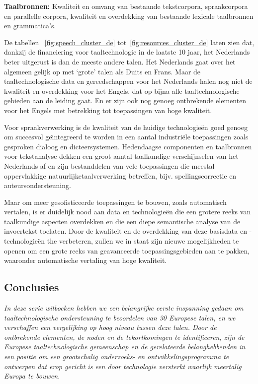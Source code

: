 \documentclass[]{../../metanetpaper}
\begin{document}
\begin{multicols}{2}
\textbf{Taalbronnen:} Kwaliteit en omvang van bestaande tekstcorpora, spraakcorpora en parallelle corpora, kwaliteit en overdekking van bestaande lexicale taalbronnen en grammatica’s.


De tabellen ~\ref{fig:speech_cluster_de} tot~\ref{fig:resources_cluster_de}  laten zien dat, dankzij de financiering voor taaltechnologie in de laatste 10 jaar, het Nederlands beter uitgerust is dan de meeste andere talen. Het Nederlands gaat over het algemeen gelijk op met `grote' talen als Duits en Frans. Maar de taaltechnologische data en gereedschappen voor het Nederlands halen nog niet de kwaliteit en overdekking voor het Engels, dat op bijna alle taaltechnologische gebieden aan de leiding gaat. En er zijn ook nog genoeg ontbrekende elementen voor het Engels met betrekking tot toepassingen van hoge kwaliteit.

   Voor spraakverwerking is de kwaliteit van de huidige technologie{\"e}n goed genoeg om succesvol ge{\"\i}ntegreerd te worden in een aantal industri{\"e}le toepassingen zoals gesproken dialoog en dicteersystemen. Hedendaagse componenten en taalbronnen voor tekstanalyse dekken een groot aantal taalkundige verschijnselen van het Nederlands af en zijn bestanddelen van vele toepassingen die meestal oppervlakkige natuurlijketaalverwerking betreffen, bijv. spellingscorrectie en auteursondersteuning.

   Maar om meer gesofisticeerde toepassingen te bouwen, zoals automatisch vertalen, is er duidelijk nood aan data en technologie{\"e}n die een grotere reeks van taalkundige aspecten overdekken en die een diepe semantische analyse van de invoertekst toelaten. Door de kwaliteit en de overdekking van deze basisdata en -technologie{\"e}n the verbeteren, zullen we in staat zijn nieuwe mogelijkheden te openen om een grote reeks van geavanceerde toepassingsgebieden aan te pakken, waaronder automatische vertaling van hoge kwaliteit.


\subsection{Conclusies}

\emph{In deze serie witboeken hebben we een belangrijke eerste inspanning gedaan om taaltechnologische ondersteuning te beoordelen van 30 Europese talen, en we verschaffen een vergelijking op hoog niveau tussen deze talen. Door de ontbrekende elementen, de noden en de tekortkomingen te identificeren, zijn de Europese taaltechnologische gemeenschap en de gerelateerde belanghebbenden in een positie om een grootschalig onderzoeks- en ontwikkelingsprogramma te ontwerpen dat erop gericht is een door technologie versterkt waarlijk meertalig Europa te bouwen.}


\end{multicols}
\end{document}

